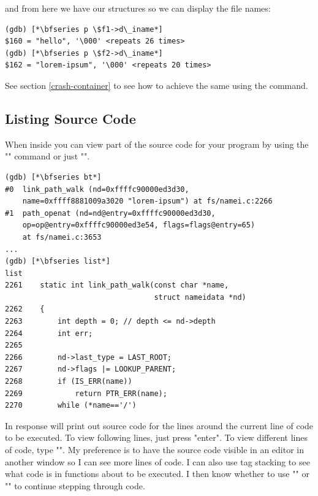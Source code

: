 \noindent
and from here we have our  structures so we can display the file names:

\begin{lstlisting}
(gdb) [*\bfseries p \$f1->d\_iname*]
$160 = "hello", '\000' <repeats 26 times>
(gdb) [*\bfseries p \$f2->d\_iname*]
$162 = "lorem-ipsum", '\000' <repeats 20 times>
\end{lstlisting}

\noindent
See section \ref{crash-container} to see how to achieve the same using the  command.


\subsection{Listing Source Code}

When inside  you can view part of the source code for your program by using the "" command or just "".

\begin{lstlisting}
(gdb) [*\bfseries bt*]
#0  link_path_walk (nd=0xffffc90000ed3d30, 
    name=0xffff8881009a3020 "lorem-ipsum") at fs/namei.c:2266
#1  path_openat (nd=nd@entry=0xffffc90000ed3d30, 
    op=op@entry=0xffffc90000ed3e54, flags=flags@entry=65) 
    at fs/namei.c:3653
...
(gdb) [*\bfseries list*]
list
2261	static int link_path_walk(const char *name, 
                                  struct nameidata *nd)
2262	{
2263		int depth = 0; // depth <= nd->depth
2264		int err;
2265	
2266		nd->last_type = LAST_ROOT;
2267		nd->flags |= LOOKUP_PARENT;
2268		if (IS_ERR(name))
2269			return PTR_ERR(name);
2270		while (*name=='/')
\end{lstlisting}

\noindent
In response  will print out source code for the lines around the current line of code to be executed. To view following lines, just press "enter". To view different lines of code, type "". My preference is to have the source code visible in an editor in another window so I can see more lines of code. I can also use tag stacking to see what code is in functions about to be executed. I then know whether to use "" or "" to continue stepping through code.


